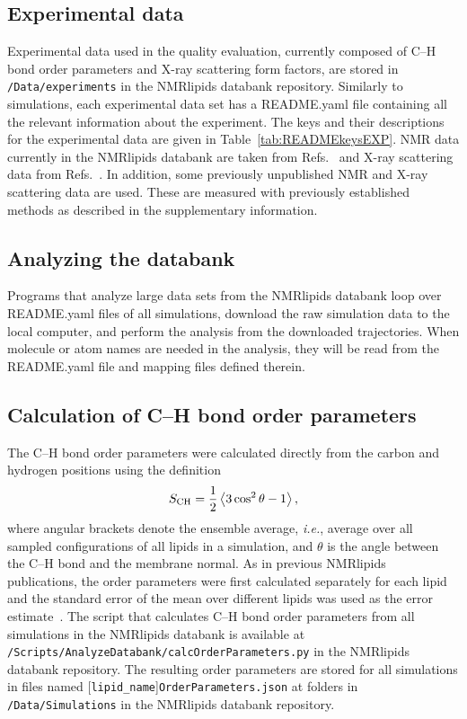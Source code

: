 \documentclass[fleqn,10pt]{wlscirep}
\begin{document}
\subsection{Experimental data}
Experimental data used in the quality evaluation, currently composed of C--H bond order parameters and X-ray scattering form factors, are stored in \texttt{/Data/experiments} in the NMRlipids databank repository. Similarly to simulations, each experimental data set has a README.yaml file containing all the relevant information about the experiment. The keys and their descriptions for the experimental data are given in Table~\ref{tab:READMEkeysEXP}. NMR data currently in the NMRlipids databank are taken from Refs.~ and X-ray scattering data from Refs.~. In addition, some previously unpublished NMR and X-ray scattering data are used. These are measured with previously established methods as described in the supplementary information. 

\subsection{Analyzing the databank}
Programs that analyze large data sets from the NMRlipids databank loop over README.yaml files of all simulations, download the raw simulation data to the local computer, and perform the analysis from the downloaded trajectories. When molecule or atom names are needed in the analysis, they will be read from the README.yaml file and mapping files defined therein.

\subsection{Calculation of C--H bond order parameters}
The C--H bond order parameters were calculated directly from the carbon and hydrogen positions using the definition
\begin{equation}\label{OP}
S_{\rm CH}=\frac{1}{2}\left\langle 3\cos^2\theta -1 \right\rangle,
\end{equation}
where angular brackets denote the ensemble average, \textit{i.e.}, average over all sampled configurations of all lipids in a simulation, and $\theta$ is the angle between the C--H bond and the membrane normal. As in previous NMRlipids publications, the order parameters were first calculated separately for each lipid and the standard error of the mean over different lipids was used as the error estimate~\cite{botan15}. The script that calculates C--H bond order parameters from all simulations in the NMRlipids databank is available at \texttt{/Scripts/AnalyzeDatabank/calcOrderParameters.py} in the NMRlipids databank repository. The resulting order parameters are stored for all simulations in files named %
[\texttt{lipid\_name}]\texttt{OrderParameters.json} at folders in \texttt{/Data/Simulations} in the NMRlipids databank repository.
\end{document}
